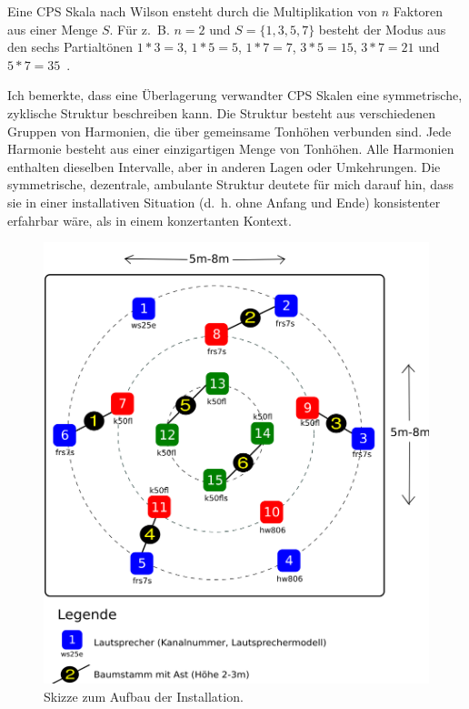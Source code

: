 \documentclass[12pt,a4paper,ngerman]{article}
\begin{document}
\smallskip

Eine CPS Skala nach Wilson ensteht durch die Multiplikation von $n$ Faktoren aus einer Menge $S$.
Für z.~B. $n=2$ und $S=\{1, 3, 5, 7\}$ besteht der Modus aus den sechs Partialtönen $1*3=3$, $1*5=5$, $1*7=7$, $3*5=15$, $3*7=21$ und $5*7=35$~\parencite[S. 150f]{ervWilsonBook}.

\smallskip

Ich bemerkte, dass eine Überlagerung verwandter CPS Skalen eine symmetrische, zyklische Struktur beschreiben kann.
Die Struktur besteht aus verschiedenen Gruppen von Harmonien, die über gemeinsame Tonhöhen verbunden sind.
Jede Harmonie besteht aus einer einzigartigen Menge von Tonhöhen.
Alle Harmonien enthalten dieselben Intervalle, aber in anderen Lagen oder Umkehrungen.
Die symmetrische, dezentrale, ambulante Struktur deutete für mich darauf hin, dass sie in einer installativen Situation (d.~h. ohne Anfang und Ende) konsistenter erfahrbar wäre, als in einem konzertanten Kontext.

\begin{figure}[h!]
        \hspace{0.5cm}
        \includegraphics[scale=0.185]{pictures/setup-thanatos-trees.png}
    \caption{%
        Skizze zum Aufbau der Installation.
    }
\end{figure}
\end{document}
